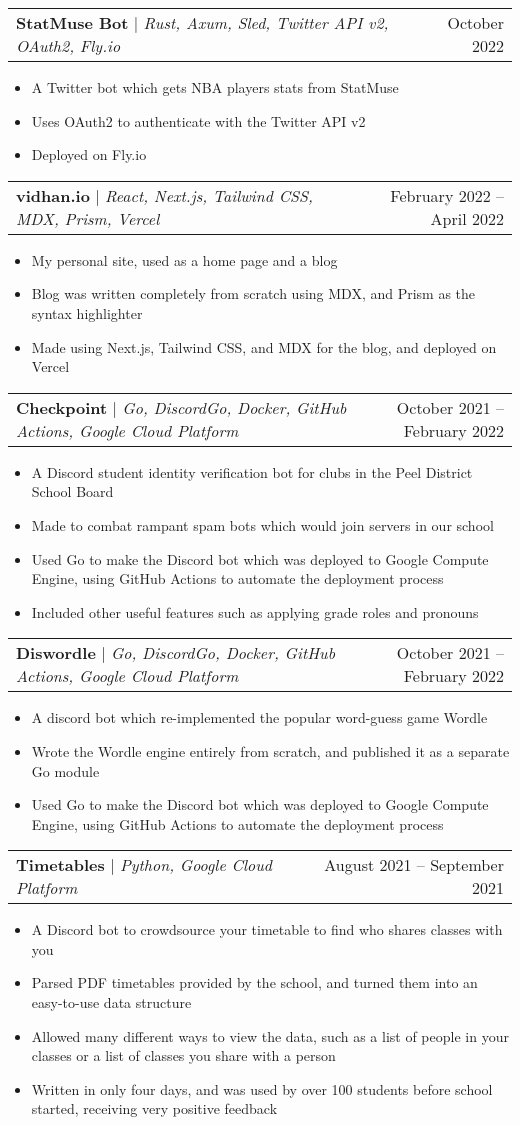 \documentclass[letterpaper,11pt]{article}
\makeatletter
\newcommand{\resumeItem}[1]{
  \item\small{
    {#1 \vspace{-2pt}}
  }
}
\newcommand{\resumeProjectHeading}[2]{
    \item
    \begin{tabular*}{0.97\textwidth}{l@{\extracolsep{\fill}}r}
      \small#1 & #2 \\
    \end{tabular*}\vspace{-7pt}
}
\newcommand{\resumeItemListStart}{\begin{itemize}}
\newcommand{\resumeItemListEnd}{\end{itemize}\vspace{-5pt}}
\makeatother
\begin{document}
\resumeProjectHeading
{\textbf{StatMuse Bot} $|$ \emph{Rust, Axum, Sled, Twitter API v2, OAuth2, Fly.io}}{October 2022}
\resumeItemListStart
\resumeItem{A Twitter bot which gets NBA players stats from StatMuse}
\resumeItem{Uses OAuth2 to authenticate with the Twitter API v2}
\resumeItem{Deployed on Fly.io}
\resumeItemListEnd

\resumeProjectHeading
{\textbf{vidhan.io} $|$ \emph{React, Next.js, Tailwind CSS, MDX, Prism, Vercel}}{February 2022 -- April 2022}
\resumeItemListStart
\resumeItem{My personal site, used as a home page and a blog}
\resumeItem{Blog was written completely from scratch using MDX, and Prism as the syntax highlighter}
\resumeItem{Made using Next.js, Tailwind CSS, and MDX for the blog, and deployed on Vercel}
\resumeItemListEnd

\resumeProjectHeading
{\textbf{Checkpoint} $|$ \emph{Go, DiscordGo, Docker, GitHub Actions, Google Cloud Platform}}{October 2021 -- February 2022}
\resumeItemListStart
\resumeItem{A Discord student identity verification bot for clubs in the Peel District School Board}
\resumeItem{Made to combat rampant spam bots which would join servers in our school}
\resumeItem{Used Go to make the Discord bot which was deployed to Google Compute Engine, using GitHub Actions to automate the deployment process}
\resumeItem{Included other useful features such as applying grade roles and pronouns}
\resumeItemListEnd

\resumeProjectHeading
{\textbf{Diswordle} $|$ \emph{Go, DiscordGo, Docker, GitHub Actions, Google Cloud Platform}}{October 2021 -- February 2022}
\resumeItemListStart
\resumeItem{A discord bot which re-implemented the popular word-guess game Wordle}
\resumeItem{Wrote the Wordle engine entirely from scratch, and published it as a separate Go module}
\resumeItem{Used Go to make the Discord bot which was deployed to Google Compute Engine, using GitHub Actions to automate the deployment process}
\resumeItemListEnd

\resumeProjectHeading
{\textbf{Timetables} $|$ \emph{Python, Google Cloud Platform}}{August 2021 -- September 2021}
\resumeItemListStart
\resumeItem{A Discord bot to crowdsource your timetable to find who shares classes with you}
\resumeItem{Parsed PDF timetables provided by the school, and turned them into an easy-to-use data structure}
\resumeItem{Allowed many different ways to view the data, such as a list of people in your classes or a list of classes you share with a person}
\resumeItem{Written in only four days, and was used by over 100 students before school started, receiving very positive feedback}
\resumeItemListEnd
\end{document}
